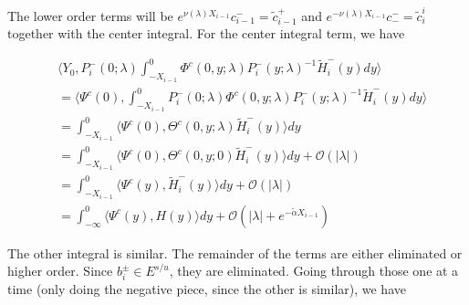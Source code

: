 \documentclass[12pt]{article}
\begin{document}
The lower order terms will be $e^{\nu(\lambda) X_{i-1}} c_{i-1}^- = \tilde{c}_{i-1}^+$ and $e^{-\nu(\lambda) X_{i-1}} c_-^- = \tilde{c}_{i}^i$ together with the center integral. For the center integral term, we have

\begin{align*}
&\langle Y_0, P_i^-(0; \lambda) \int_{-X_{i-1}}^0 \Phi^c(0, y; \lambda) P_i^-(y; \lambda)^{-1} \tilde{H}_i^-(y) dy \rangle \\
&= \langle \Psi^c(0), \int_{-X_{i-1}}^0 P_i^-(0; \lambda) \Phi^c(0, y; \lambda) P_i^-(y; \lambda)^{-1} \tilde{H}_i^-(y) dy \rangle \\
&= \int_{-X_{i-1}}^0 \langle \Psi^c(0), \Theta^c(0, y; \lambda) \tilde{H}_i^-(y) \rangle dy \\
&= \int_{-X_{i-1}}^0 \langle \Psi^c(0), \Theta^c(0, y; 0) \tilde{H}_i^-(y) \rangle dy + \mathcal{O}(|\lambda|)\\
&= \int_{-X_{i-1}}^0 \langle \Psi^c(y), \tilde{H}_i^-(y) \rangle dy + \mathcal{O}(|\lambda|)\\
&= \int_{-\infty}^0 \langle \Psi^c(y), H(y) \rangle dy + \mathcal{O}(|\lambda| + e^{-\tilde{\alpha}X_{i-1}})
\end{align*}

The other integral is similar. The remainder of the terms are either eliminated or higher order. Since $b_i^\pm \in E^{s/u}$, they are eliminated.
Going through those one at a time (only doing the negative piece, since the other is similar), we have
\end{document}
